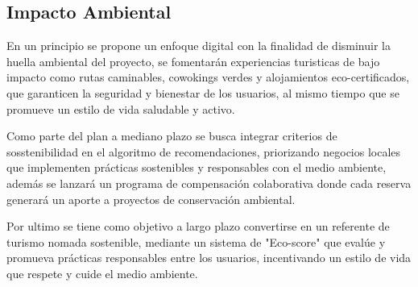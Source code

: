 \subsection{Impacto Ambiental}
En un principio se propone un enfoque digital con la finalidad de disminuir la huella ambiental del proyecto, se fomentarán experiencias turisticas de bajo impacto como rutas caminables, cowokings verdes y alojamientos eco-certificados, que garanticen la seguridad y bienestar de los usuarios, al mismo tiempo que se promueve un estilo de vida saludable y activo.

Como parte del plan a mediano plazo se busca integrar criterios de sosstenibilidad en el algoritmo de recomendaciones, priorizando negocios locales que implementen prácticas sostenibles y responsables con el medio ambiente, además se lanzará un programa de compensación colaborativa donde cada reserva generará un aporte a proyectos de conservación ambiental.

Por ultimo se tiene como objetivo a largo plazo convertirse en un referente de turismo nomada sostenible, mediante un sistema de "Eco-score" que evalúe y promueva prácticas responsables entre los usuarios, incentivando un estilo de vida que respete y cuide el medio ambiente.
